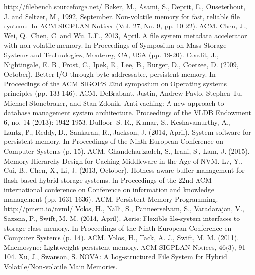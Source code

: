 \begin{thebibliography}{99}
 http://filebench.sourceforge.net/
 Baker, M., Asami, S., Deprit, E., Ouseterhout, J. and Seltzer, M., 1992, September. Non-volatile memory for fast, reliable file systems. In ACM SIGPLAN Notices (Vol. 27, No. 9, pp. 10-22). ACM.	
 Chen, J., Wei, Q., Chen, C. and Wu, L.F., 2013, April. A file system metadata accelerator with non-volatile memory. In Proceedings of Symposium on Mass Storage Systems and Technologies, Monterey, CA, USA (pp. 19-20).
 Condit, J., Nightingale, E. B., Frost, C., Ipek, E., Lee, B., Burger, D.,  Coetzee, D. (2009, October). Better I/O through byte-addressable, persistent memory. In Proceedings of the ACM SIGOPS 22nd symposium on Operating systems principles (pp. 133-146). ACM.
 DeBrabant, Justin, Andrew Pavlo, Stephen Tu, Michael Stonebraker, and Stan Zdonik. Anti-caching: A new approach to database management system architecture. Proceedings of the VLDB Endowment 6, no. 14 (2013): 1942-1953.
 Dulloor, S. R., Kumar, S., Keshavamurthy, A., Lantz, P., Reddy, D., Sankaran, R., Jackson, J. (2014, April). System software for persistent memory. In Proceedings of the Ninth European Conference on Computer Systems (p. 15). ACM.
 Ghandeharizadeh, S., Irani, S., Lam, J. (2015). Memory Hierarchy Design for Caching Middleware in the Age of NVM.
 Lv, Y., Cui, B., Chen, X., Li, J. (2013, October). Hotness-aware buffer management for flash-based hybrid storage systems. In Proceedings of the 22nd ACM international conference on Conference on information and knowledge management (pp. 1631-1636). ACM.	
 Persistent Memory Programming. http://pmem.io/nvml/
 Volos, H., Nalli, S., Panneerselvam, S., Varadarajan, V., Saxena, P., Swift, M. M. (2014, April). Aerie: Flexible file-system interfaces to storage-class memory. In Proceedings of the Ninth European Conference on Computer Systems (p. 14). ACM.
 Volos, H., Tack, A. J., Swift, M. M. (2011). Mnemosyne: Lightweight persistent memory. ACM SIGPLAN Notices, 46(3), 91-104.	
 Xu, J., Swanson, S. NOVA: A Log-structured File System for Hybrid Volatile/Non-volatile Main Memories.
\end{thebibliography}


